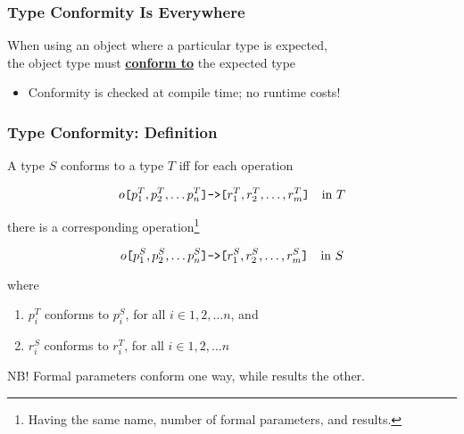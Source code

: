 \begin{frame}[fragile]

\frametitle{Type Conformity Is Everywhere}

\begin{center}

When using an object where a particular type is expected,\\ the object
type must \textbf{\underline{conform to}} the expected type

\end{center}

\begin{itemize}

\item Conformity is checked at compile time; no runtime costs!

\end{itemize}


\end{frame}


\begin{frame}[fragile]

\frametitle{Type Conformity: Definition}

\newcommand{\emlbr}{\ensuremath{\text{\texttt{[}}}}
\newcommand{\emrbr}{\ensuremath{\text{\texttt{]}}}}
\newcommand{\emrarr}{\ensuremath{\text{\texttt{->}}}}
\newcommand{\emsig}[3]{\ensuremath{#1\emlbr {#2}\emrbr\emrarr\emlbr {#3}\emrbr}}

A type $S$ conforms to a type $T$ iff for each operation

$$\emsig{o}{p^T_1, p^T_2, \ldots p^T_n}{r^T_1, r^T_2, \ldots,
r^T_m}\quad \text{in}\ T$$

there is a corresponding operation\footnote{Having the same name,
number of formal parameters, and results.}

$$\emsig{o}{p^S_1, p^S_2, \ldots p^S_n}{r^S_1, r^S_2, \ldots,
r^S_m}\quad \text{in}\ S$$

where

\begin{enumerate}

\item $p^T_i$ conforms to $p^S_i$, for all $i \in 1, 2, \ldots n$, and

\item $r^S_i$ conforms to $r^T_i$, for all $i \in 1, 2, \ldots n$

\end{enumerate}

\vspace{\fill}

\begin{center}

NB! Formal parameters conform one way, while results the other.

\end{center}

\end{frame}


